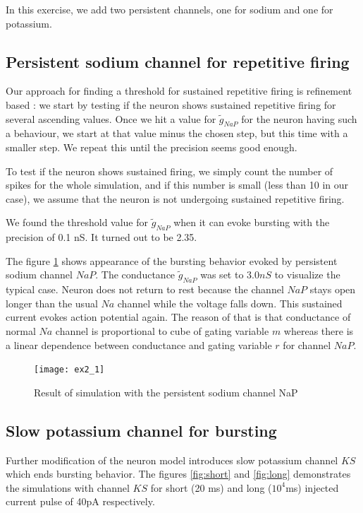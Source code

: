 \documentclass[a4paper,11pt]{article} %
\begin{document}
In this exercise, we add two persistent channels, one for sodium
and one for potassium.

\subsection{Persistent sodium channel for repetitive firing}

Our approach for finding a threshold for sustained repetitive
firing is refinement based : we start by testing if the neuron
shows sustained repetitive firing for several ascending values.
Once we hit a value for $\tilde{g}_{NaP}$ for the neuron having
such a behaviour, we start at that value minus the chosen step,
but this time with a smaller step. We repeat this until the
precision seems good enough.

To test if the neuron shows sustained firing, we simply count
the number of spikes for the whole simulation, and if this number
is small (less than 10 in our case), we assume that the neuron is
not undergoing sustained repetitive firing.

We found the threshold value for $\tilde{g}_{NaP}$ when it can evoke bursting 
with the precision of 0.1 nS. It turned out to be 2.35.

The figure \ref{fig:2.1} shows appearance of the bursting behavior evoked by 
persistent sodium channel $NaP$. The conductance $\tilde{g}_{NaP}$ was
set to $3.0 nS$ to visualize the typical case. Neuron does not return
to rest because the channel $NaP$ stays open longer than the usual $Na$ channel
while the voltage falls down. This sustained current evokes action potential
again. The reason of that is that conductance of normal $Na$ channel is 
proportional to cube of gating variable $m$ whereas there is a linear dependence
between conductance and gating variable $r$ for channel $NaP$.

\begin{figure}[H]
    \centering
    \texttt{[image: ex2\_1]}
    \caption{Result of simulation with the persistent sodium channel NaP}
    \label{fig:2.1}
\end{figure}

\subsection{Slow potassium channel for bursting}

Further modification of the neuron model introduces slow potassium channel $KS$
which ends bursting behavior. The figures \ref{fig:short} and \ref{fig:long}
demonstrates the simulations with channel $KS$ for short (20 ms) and long ($10^4$ms) injected
current pulse of 40pA respectively.
\end{document}
